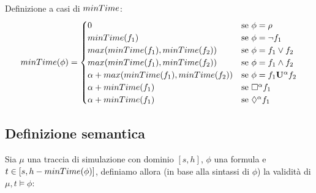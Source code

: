 \documentclass[10pt,a4paper]{article}
\begin{document}
	\paragraph{}Definizione a casi di $minTime$: 
	\begin{equation*}
	minTime(\phi)= \begin{cases}
	0									 	& \text{se } \phi=\rho\\
	minTime(f_1)							& \text{se } \phi=\lnot f_1\\
	max(minTime(f_1),minTime(f_2))	 	& \text{se } \phi=f_1\lor f_2\\
	max(minTime(f_1),minTime(f_2))	 	& \text{se } \phi=f_1\land f_2\\
	\alpha+max(minTime(f_1),minTime(f_2)) & \text{se } \phi=f_1\mathbf{U^{\alpha}} f_2\\
	\alpha + minTime(f_1)					& \text{se } \Box^{\alpha} f_1\\
	\alpha + minTime(f_1)					& \text{se } \Diamond^{\alpha} f_1\\
	\end{cases}
	\end{equation*}
	

	\subsection{Definizione semantica}
	Sia $\mu$ una traccia di simulazione con dominio $[s,h]$, $\phi$ una formula \BLTL{} e $t\in[s,h-minTime(\phi)]$, definiamo allora (in base alla sintassi di $\phi$) la validità di $\mu,t \models \phi$:
	
\end{document}
